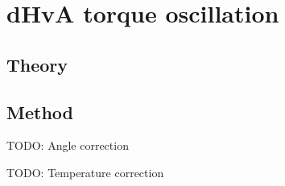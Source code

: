 
\section{dHvA torque oscillation}

\subsection{Theory}

\subsection{Method}

TODO: Angle correction

TODO: Temperature correction

